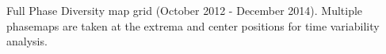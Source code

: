 Full Phase Diversity map grid (October 2012 - December 2014). Multiple phasemaps are taken at the extrema and center positions for time variability analysis.
\label{fig:inst_phase_maps}    